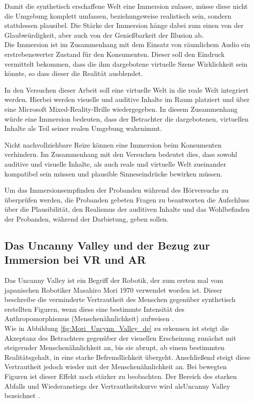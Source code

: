  Damit die synthetisch erschaffene Welt eine Immersion zulasse, müsse diese nicht die Umgebung komplett umfassen, beziehungsweise realistisch sein, sondern stattdessen plausibel\cite[S.17]{Grau03}. Die Stärke der Immersion hänge dabei zum einen von der Glaubwürdigkeit, aber auch von der Genießbarkeit der Illusion ab\cite[S.17]{Grau03}. \\
 
 Die Immersion ist im Zusammenhang mit dem Einsatz von räumlichem Audio ein erstrebenswerter Zustand für den Konsumenten. Dieser soll den Eindruck vermittelt bekommen, dass die ihm dargebotene virtuelle Szene Wirklichkeit sein könnte, so dass dieser die Realität ausblendet.
 
In den Versuchen dieser Arbeit soll eine virtuelle Welt in die reale Welt integriert werden. Hierbei werden visuelle und auditive Inhalte im Raum platziert und über eine Microsoft Mixed-Reality-Brille wiedergegeben. In diesem Zusammenhang würde eine Immersion bedeuten, dass der Betrachter die dargebotenen, virtuellen Inhalte als Teil seiner realen Umgebung wahrnimmt. 
 
 Nicht nachvollziehbare Reize können eine Immersion beim Konsumenten verhindern\cite[S.17]{Grau03}. Im Zusammenhang mit den Versuchen bedeutet dies, dass sowohl auditive und visuelle Inhalte, als auch reale und virtuelle Welt zueinander kompatibel sein müssen und plausible Sinneseindrücke bewirken müssen. 
 
 Um das Immersionsempfinden der Probanden während des Hörversuchs zu überprüfen werden, die Probanden gebeten Fragen zu beantworten die Aufschluss über die Plausibilität, den Realismus der auditiven Inhalte und das Wohlbefinden der Probanden, während der Darbietung, geben sollen. 
 
 \vspace*{20pt}
\subsection{Das Uncanny Valley und der Bezug zur Immersion bei VR und AR}

Das \glqq Uncanny Valley \grqq{} ist ein Begriff der Robotik, der zum ersten mal vom japanischen Robotiker Masahiro Mori 1970 verwendet worden ist. Dieser beschreibe die verminderte Vertrautheit des Menschen gegenüber synthetisch erstellten Figuren, wenn diese eine bestimmte Intensität des Anthropomorphismus (Menschenähnlichkeit) aufweisen \cite{Mori70}.\\


Wie in Abbildung \ref{fig:Mori_Uncynn_Valley_de} zu erkennen ist steigt die Akzeptanz des Betrachters gegenüber der visuellen Erscheinung zunächst mit steigernder Menschenähnlichkeit an, bis sie abrupt, ab einem bestimmten Realitätsgehalt, in eine starke Befremdlichkeit übergeht. Anschließend steigt diese Vertrautheit jedoch wieder mit der Menschenähnlichkeit an. Bei bewegten Figuren ist dieser Effekt noch stärker zu beobachten. Der Bereich des starken Abfalls und Wiederanstiegs der Vertrautheitskurve wird als\glqq Uncanny Valley \grqq{} bezeichnet \cite{Mori70}.\\

